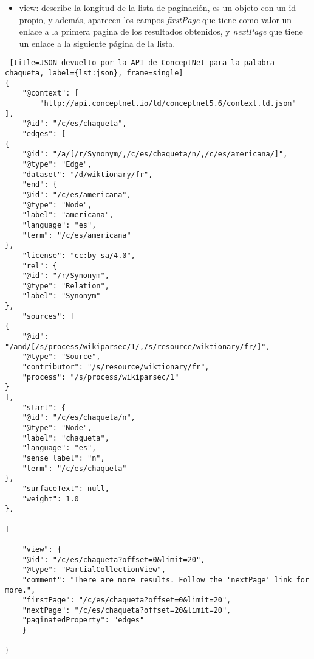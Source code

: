 \begin{itemize}
\begin{itemize}
		\item start: describe el nodo origen, es decir, la palabra que hemos introducido en ConceptNet para que haga la consulta, este campo esta compuesto por elementos ya descritos como son: @id, @type, label, language y term.
		\item surfaceText: indica de que frase del lenguaje natural se han extraido los datos que estan guardados en conceptnet. En nuestro caso es nulo.
		\item weight: indica la fiabilidad de la información guardada en conceptnet, siendo normal que su valor sea 1.0. Cuanto mayor sea este valor, más fiables serán.
	\end{itemize}
	\item view: describe la longitud de la lista de paginación, es un objeto con un id propio, y además, aparecen los campos \textit{firstPage} que tiene como valor un enlace a la primera pagina de los resultados obtenidos, y \textit{nextPage} que tiene un enlace a la siguiente página de la lista.
\end{itemize}


\begin{lstlisting} [title=JSON devuelto por la API de ConceptNet para la palabra chaqueta, label={lst:json}, frame=single]
{
	"@context": [
		"http://api.conceptnet.io/ld/conceptnet5.6/context.ld.json"
],
	"@id": "/c/es/chaqueta",
	"edges": [
{
	"@id": "/a/[/r/Synonym/,/c/es/chaqueta/n/,/c/es/americana/]",
	"@type": "Edge",
	"dataset": "/d/wiktionary/fr",
	"end": {
	"@id": "/c/es/americana",
	"@type": "Node",
	"label": "americana",
	"language": "es",
	"term": "/c/es/americana"
},
	"license": "cc:by-sa/4.0",
	"rel": {
	"@id": "/r/Synonym",
	"@type": "Relation",
	"label": "Synonym"
},
	"sources": [
{
	"@id": "/and/[/s/process/wikiparsec/1/,/s/resource/wiktionary/fr/]",
	"@type": "Source",
	"contributor": "/s/resource/wiktionary/fr",
	"process": "/s/process/wikiparsec/1"
}
],
	"start": {
	"@id": "/c/es/chaqueta/n",
	"@type": "Node",
	"label": "chaqueta",
	"language": "es",
	"sense_label": "n",
	"term": "/c/es/chaqueta"
},
	"surfaceText": null,
	"weight": 1.0
},

]

	"view": {
	"@id": "/c/es/chaqueta?offset=0&limit=20",
	"@type": "PartialCollectionView",
	"comment": "There are more results. Follow the 'nextPage' link for more.",
	"firstPage": "/c/es/chaqueta?offset=0&limit=20",
	"nextPage": "/c/es/chaqueta?offset=20&limit=20",
	"paginatedProperty": "edges"
	}

}
\end{lstlisting} 



